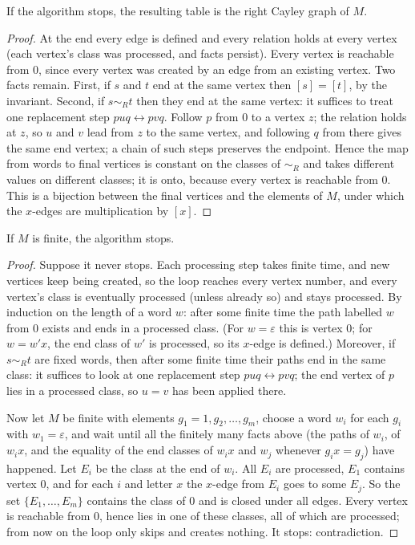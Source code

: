 \documentclass[11pt]{article}
\begin{document}
\begin{theorembox}
If the algorithm stops, the resulting table is the right Cayley graph of $M$.
\end{theorembox}
\begin{proof}
At the end every edge is defined and every relation holds at every vertex (each vertex's class was processed, and facts persist). Every vertex is reachable from $0$, since every vertex was created by an edge from an existing vertex.
Two facts remain. First, if $s$ and $t$ end at the same vertex then $[s]=[t]$, by the invariant.
Second, if $s\sim_R t$ then they end at the same vertex: it suffices to treat one replacement step $puq\leftrightarrow pvq$. Follow $p$ from $0$ to a vertex $z$; the relation holds at $z$, so $u$ and $v$ lead from $z$ to the same vertex, and following $q$ from there gives the same end vertex; a chain of such steps preserves the endpoint.
Hence the map from words to final vertices is constant on the classes of $\sim_R$ and takes different values on different classes; it is onto, because every vertex is reachable from $0$. This is a bijection between the final vertices and the elements of $M$, under which the $x$-edges are multiplication by $[x]$.
\end{proof}

\begin{theorembox}
If $M$ is finite, the algorithm stops.
\end{theorembox}
\begin{proof}
Suppose it never stops. Each processing step takes finite time, and new vertices keep being created, so the loop reaches every vertex number, and every vertex's class is eventually processed (unless already so) and stays processed.
By induction on the length of a word $w$: after some finite time the path labelled $w$ from $0$ exists and ends in a processed class. (For $w=\varepsilon$ this is vertex $0$; for $w=w'x$, the end class of $w'$ is processed, so its $x$-edge is defined.)
Moreover, if $s\sim_R t$ are fixed words, then after some finite time their paths end in the same class: it suffices to look at one replacement step $puq\leftrightarrow pvq$; the end vertex of $p$ lies in a processed class, so $u=v$ has been applied there.

Now let $M$ be finite with elements $g_1=1,g_2,\dots,g_m$, choose a word $w_i$ for each $g_i$ with $w_1=\varepsilon$, and wait until all the finitely many facts above (the paths of $w_i$, of $w_ix$, and the equality of the end classes of $w_ix$ and $w_j$ whenever $g_ix=g_j$) have happened.
Let $E_i$ be the class at the end of $w_i$. All $E_i$ are processed, $E_1$ contains vertex $0$, and for each $i$ and letter $x$ the $x$-edge from $E_i$ goes to some $E_j$. So the set $\{E_1,\dots,E_m\}$ contains the class of $0$ and is closed under all edges.
Every vertex is reachable from $0$, hence lies in one of these classes, all of which are processed; from now on the loop only skips and creates nothing. It stops: contradiction.
\end{proof}
\end{document}
